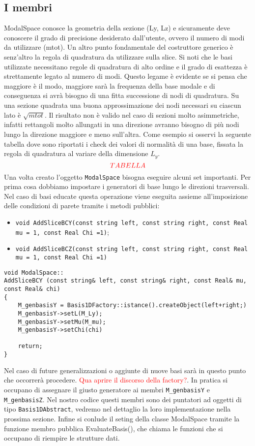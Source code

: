 \subsection{I membri}
ModalSpace conosce la geometria della sezione (Ly, Lz) e sicuramente deve conoscere il grado di precisione desiderato dall'utente, ovvero il numero di modi da utilizzare (mtot). 
Un altro punto fondamentale del costruttore generico \`e senz'altro la regola di quadratura da utilizzare sulla slice. Si noti che le basi utilizzate necessitano regole di quadratura di alto ordine e il grado di esattezza \`e strettamente legato al numero di modi. Questo legame \`e evidente se si pensa che maggiore \`e il modo, maggiore sar\`a la frequenza della base modale e di conseguenza si avr\`a bisogno di una fitta successione di nodi di quadratura. Su una sezione quadrata una buona approssimazione dei nodi necessari su ciascun lato \`e $\sqrt{mtot}$. Il risultato non \`e valido nel caso di sezioni molto asimmetriche, infatti rettangoli molto allungati in una direzione avranno bisogno di pi\`u nodi lungo la direzione maggiore e meno sull'altra. Come esempio si osservi la seguente tabella dove sono riportati i check dei valori di normalit\`a di una base, fissata la regola di quadratura al variare della dimensione $L_y$.
\begin{equation}
\textcolor{red}{TABELLA}
\end{equation}
Una volta creato l'oggetto \texttt{ModalSpace} bisogna eseguire alcuni set importanti. Per prima cosa dobbiamo impostare i generatori di base lungo le direzioni trasversali. Nel caso di basi educate questa operazione viene eseguita assieme all'imposizione delle condizioni di parete tramite i metodi pubblici:
\begin{itemize}
\item \texttt{void AddSliceBCY(const string left, const string right, const Real mu = 1, const Real Chi =1)};
\item \texttt{void AddSliceBCZ(const string left, const string right, const Real mu = 1, const Real Chi =1)}
\end{itemize}

\begin{lstlisting}[style = general]
void ModalSpace::
AddSliceBCY (const string& left, const string& right, const Real& mu, const Real& chi)
{
	M_genbasisY = Basis1DFactory::istance().createObject(left+right;)
	M_genbasisY->setL(M_Ly);
	M_genbasisY->setMu(M_mu);
	M_genbasisY->setChi(chi)
	
	return;
}
\end{lstlisting}
 Nel caso di future generalizzazioni o aggiunte di nuove basi sar\`a in questo punto che occorrer\`a procedere.
\textcolor{red}{Qua aprire il discorso della factory?}. In pratica si occupano di assegnare il giusto generatore ai membri \texttt{M\_genbasisY} e \texttt{M\_genbasisZ}. Nel nostro codice questi membri sono dei puntatori ad oggetti di tipo \texttt{Basis1DAbstract}, vedremo nel dettaglio la loro implementazione nella prossima sezione. 
Infine si conlude il seting della classe ModalSpace tramite la funzione membro pubblica EvaluateBasis(), che chiama le funzioni che si occupano di riempire le strutture dati.

